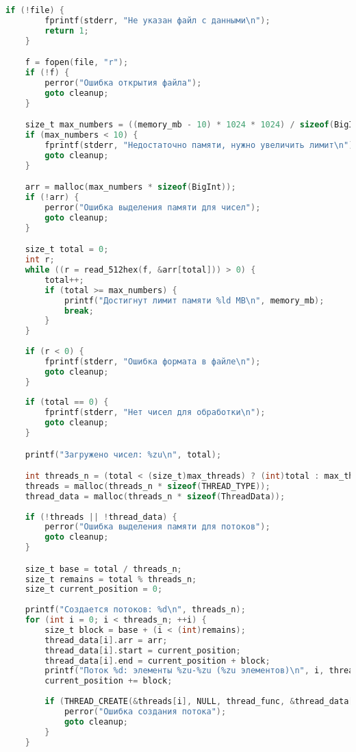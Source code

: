 \documentclass[12pt,a4paper]{article}
\begin{document}
\begin{itemize}
\begin{lstlisting}[language=C,caption=Основная программа]
    if (!file) {
        fprintf(stderr, "Не указан файл с данными\n");
        return 1;
    }

    f = fopen(file, "r");
    if (!f) { 
        perror("Ошибка открытия файла");
        goto cleanup;
    }

    size_t max_numbers = ((memory_mb - 10) * 1024 * 1024) / sizeof(BigInt);
    if (max_numbers < 10) {
        fprintf(stderr, "Недостаточно памяти, нужно увеличить лимит\n");
        goto cleanup;
    }

    arr = malloc(max_numbers * sizeof(BigInt));
    if (!arr) {
        perror("Ошибка выделения памяти для чисел");
        goto cleanup;
    }

    size_t total = 0;
    int r;
    while ((r = read_512hex(f, &arr[total])) > 0) {
        total++;
        if (total >= max_numbers) {
            printf("Достигнут лимит памяти %ld MB\n", memory_mb);
            break;
        }
    }
    
    if (r < 0) {
        fprintf(stderr, "Ошибка формата в файле\n");
        goto cleanup;
    }
    
    if (total == 0) {
        fprintf(stderr, "Нет чисел для обработки\n");
        goto cleanup;
    }

    printf("Загружено чисел: %zu\n", total);

    int threads_n = (total < (size_t)max_threads) ? (int)total : max_threads;
    threads = malloc(threads_n * sizeof(THREAD_TYPE));
    thread_data = malloc(threads_n * sizeof(ThreadData));
    
    if (!threads || !thread_data) {
        perror("Ошибка выделения памяти для потоков");
        goto cleanup;
    }

    size_t base = total / threads_n;
    size_t remains = total % threads_n;
    size_t current_position = 0;
    
    printf("Создается потоков: %d\n", threads_n);
    for (int i = 0; i < threads_n; ++i) {
        size_t block = base + (i < (int)remains);
        thread_data[i].arr = arr;
        thread_data[i].start = current_position;
        thread_data[i].end = current_position + block;
        printf("Поток %d: элементы %zu-%zu (%zu элементов)\n", i, thread_data[i].start, thread_data[i].end - 1, block);
        current_position += block;
        
        if (THREAD_CREATE(&threads[i], NULL, thread_func, &thread_data[i]) != 0) {
            perror("Ошибка создания потока");
            goto cleanup;
        }
    }


\end{lstlisting}
\end{itemize}
\end{document}
